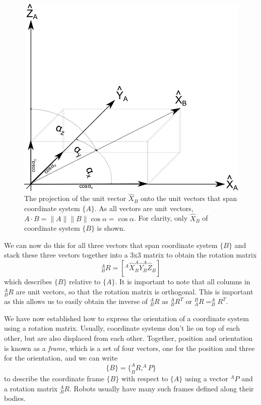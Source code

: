 \begin{figure}
	\centering
		\includegraphics[width=\textwidth]{figs/projection.png}
	\caption{The projection of the unit vector $\hat{X}_B$ onto the unit vectors that span coordinate system $\{A\}$. As all vectors are unit vectors, $A\cdot B=\|A\|\|B\|\cos \alpha=\cos \alpha$. For clarity, only $\hat{X}_B$ of coordinate system $\{B\}$ is shown. }
	\label{fig:for}
\end{figure}

We can now do this for all three vectors that span coordinate system $\{B\}$ and stack these three vectors together into a 3x3 matrix to obtain the rotation matrix
%
\begin{equation}
^A_BR=[^A\hat{X}_B ^A\hat{Y}_B ^A\hat{Z}_B]
\end{equation}
%
which describes $\{B\}$ relative to $\{A\}$. It is important to note that all columns in $ ^A_BR$ are unit vectors, so that the rotation matrix is orthogonal. This is important as this allows us to easily obtain the inverse of $ ^A_BR$ as $ ^A_BR^T$ or
$ ^B_AR=^A_BR^T$. 


We have now established how to express the orientation of a coordinate system using a rotation matrix. Usually, coordinate systems don't lie on top of each other, but are also displaced from each other. 
Together, position and orientation is known as a \emph{frame}, which is a set of four vectors, one for the position and three for the orientation, and we can write
%
\begin{equation}
\{B\}=\{^A_BR, ^AP\}
\end{equation}
%
to describe the coordinate frame $\{B\}$ with respect to $\{A\}$ using a vector $^AP$ and a rotation matrix $^A_BR$. Robots usually have many such frames defined along their bodies.

